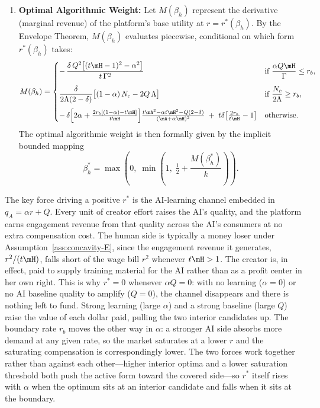 \begin{proposition}
\begin{enumerate}
    \item \textbf{Optimal Algorithmic Weight:}  Let $M(\beta_h)$ represent the derivative (marginal revenue) of the platform's base utility at $r = r^*(\beta_h)$. By the Envelope Theorem, $M(\beta_h)$ evaluates piecewise, conditional on which form $r^*(\beta_h)$ takes:
    \begin{equation}
        M(\beta_h) =
        \begin{cases}
            \displaystyle -\,\frac{\delta\,Q^2\bigl[(t\mH - 1)^2 - \alpha^2\bigr]}{t\,\Gamma^2} & \text{if } \dfrac{\alpha Q\mH}{\Gamma} \le r_b, \\[12pt]
            \displaystyle \frac{\delta}{2\Lambda (2-\delta)}\bigl[(1-\alpha)\,N_c - 2Q\,\Lambda\bigr] & \text{if } \dfrac{N_c}{2\Lambda} \ge r_b, \\[12pt]
            -\,\delta\!\left[2\alpha + \frac{2r_b[(1-\alpha) - t\mH]}{t\mH}\right]\!\frac{t\mA^2 - \alpha t\mH^2 - Q(2-\delta)}{(\mA+\alpha\mH)^2} \;+\; t\delta\!\left[\frac{2r_b}{t\mH} - 1\right] &  \text{otherwise}.
        \end{cases}
    \end{equation}
    The optimal algorithmic weight is then formally given by the implicit bounded mapping
    \begin{equation}
        \beta_h^* = \max\!\left(0,\;\min\!\left(1,\; \tfrac{1}{2} + \frac{M(\beta_h^*)}{k}\right)\right).
    \end{equation} 
\end{enumerate}
\end{proposition}


The key force driving a positive $r^*$ is the AI-learning channel embedded in $q_A = \alpha r + Q$. Every unit of creator effort raises the AI's quality, and the platform earns engagement revenue from that quality across the AI's consumers at no extra compensation cost. The human side is typically a money loser under Assumption~\ref{ass:concavity-E}, since the engagement revenue it generates, $r^2/(t\mH)$, falls short of the wage bill $r^2$ whenever $t\mH > 1$. The creator is, in effect, paid to supply training material for the AI rather than as a profit center in her own right. This is why $r^* = 0$ whenever $\alpha Q = 0$: with no learning ($\alpha = 0$) or no AI baseline quality to amplify ($Q = 0$), the channel disappears and there is nothing left to fund. Strong learning (large $\alpha$) and a strong baseline (large $Q$) raise the value of each dollar paid, pulling the two interior candidates up. The boundary rate $r_b$ moves the other way in $\alpha$: a stronger AI side absorbs more demand at any given rate, so the market saturates at a lower $r$ and the saturating compensation is correspondingly lower. The two forces work together rather than against each other---higher interior optima and a lower saturation threshold both push the active form toward the covered side---so $r^*$ itself rises with $\alpha$ when the optimum sits at an interior candidate and falls when it sits at the boundary.

